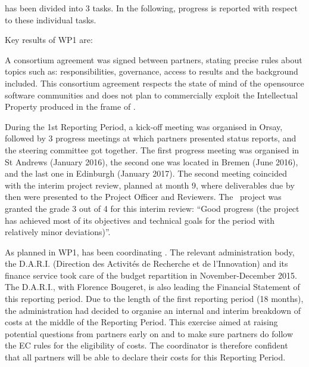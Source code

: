 \documentclass{deliverablereport}
\begin{document}
 has been divided into 3 tasks. In the following, progress is reported with respect to these individual tasks.

Key results of WP1 are:

\begin{subitemize}
\end{subitemize}


A consortium agreement was signed
between partners, stating precise rules about topics such as:
responsibilities, governance, access to results and the background
included.  This consortium agreement respects the state of mind of the opensource software communities and does not plan to commercially exploit the Intellectual Property produced in the frame of \ODK.

During the 1st Reporting Period, a kick-off meeting was organised in Orsay, followed by
3 progress meetings at which partners presented status reports, and
the steering committee got together.  The first progress meeting was
organised in St Andrews (January 2016), the second one was located
in Bremen (June 2016), and the last one in Edinburgh (January 2017). The second meeting coincided with the interim project
review, planned at month 9, where deliverables due by then were
presented to the Project Officer and Reviewers. The \ODK\ project was
granted the grade 3 out of 4 for this interim review: ``Good progress
(the project has achieved most of its objectives and technical goals
for the period with relatively minor deviations)''.

As planned in WP1,  has been coordinating \ODK.  The  relevant administration body, the D.A.R.I. (Direction des Activités de Recherche et de l'Innovation) and its finance service took care of the budget repartition in November-December 2015. The D.A.R.I., with Florence Bougeret, is also leading the Financial Statement of this reporting period. Due to the length of the first reporting period (18 months), the  administration had decided to organise an internal and interim
breakdown of costs at the middle of the Reporting Period. This exercise aimed at raising potential questions
from partners early on and to make sure partners do follow the EC
rules for the eligibility of costs. The coordinator is therefore confident that all partners will be able to declare their costs for this Reporting Period.
\end{document}
